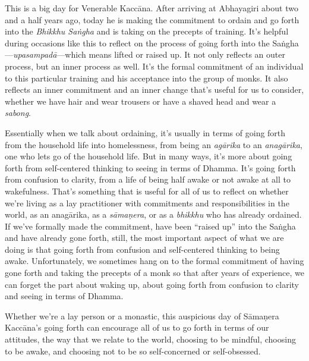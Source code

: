 This is a big day for Venerable Kaccāna. After arriving at Abhayagiri 
about two and a half years ago, today he is making the commitment to 
ordain and go forth into the \emph{Bhikkhu Saṅgha} and is taking on 
the precepts of training. It's helpful during occasions like this to 
reflect on the process of going forth into the 
Saṅgha---\emph{upasampadā}---which means lifted or raised up. It not 
only reflects an outer process, but an inner process as well. It's the 
formal commitment of an individual to this particular training and his 
acceptance into the group of monks. It also reflects an inner 
commitment and an inner change that's useful for us to consider, 
whether we have hair and wear trousers or have a shaved head and wear a 
\emph{sabong}.

Essentially when we talk about ordaining, it's usually in terms of 
going forth from the household life into homelessness, from being an 
\emph{agārika} to an \emph{anagārika}, one who lets go of the 
household life. But in many ways, it's more about going forth from 
self-centered thinking to seeing in terms of Dhamma. It's going forth 
from confusion to clarity, from a life of being half awake or not awake 
at all to wakefulness. That's something that is useful for all of us to 
reflect on whether we're living as a lay practitioner with commitments 
and responsibilities in the world, as an anagārika, as a 
\emph{sāmaṇera}, or as a \emph{bhikkhu} who has already ordained. If 
we've formally made the commitment, have been ``raised up'' into the 
Saṅgha and have already gone forth, still, the most important aspect 
of what we are doing is that going forth from confusion and 
self-centered thinking to being awake. Unfortunately, we sometimes hang 
on to the formal commitment of having gone forth and taking the 
precepts of a monk so that after years of experience, we can forget the 
part about waking up, about going forth from confusion to clarity and 
seeing in terms of Dhamma.

Whether we're a lay person or a monastic, this auspicious day of 
Sāmaṇera Kaccāna's going forth can encourage all of us to go forth 
in terms of our attitudes, the way that we relate to the world, 
choosing to be mindful, choosing to be awake, and choosing not to be so 
self-concerned or self-obsessed.

